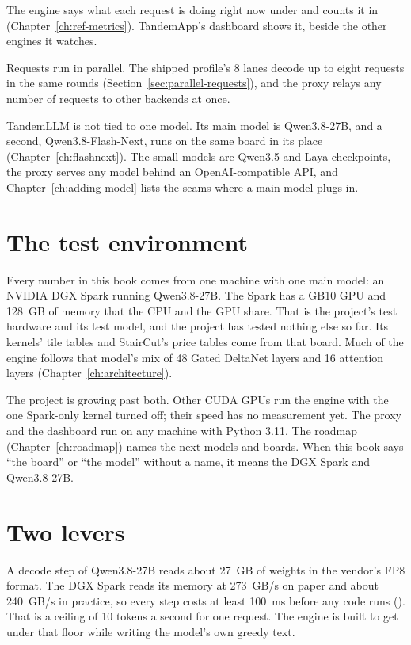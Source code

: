 The engine says what each request is doing right now under  and counts it in  (Chapter~\ref{ch:ref-metrics}). TandemApp's dashboard shows it, beside the other engines it watches.

Requests run in parallel. The shipped profile's 8 lanes decode up to eight requests in the same rounds (Section~\ref{sec:parallel-requests}), and the proxy relays any number of requests to other backends at once.

TandemLLM is not tied to one model. Its main model is Qwen3.8-27B, and a second, Qwen3.8-Flash-Next, runs on the same board in its place (Chapter~\ref{ch:flashnext}). The small models are Qwen3.5 and Laya checkpoints, the proxy serves any model behind an OpenAI-compatible API, and Chapter~\ref{ch:adding-model} lists the seams where a main model plugs in.

\section{The test environment}\label{sec:test-env}

Every number in this book comes from one machine with one main model: an NVIDIA DGX Spark running Qwen3.8-27B. The Spark has a GB10 GPU and 128~GB of memory that the CPU and the GPU share. That is the project's test hardware and its test model, and the project has tested nothing else so far. Its kernels' tile tables and StairCut's price tables come from that board. Much of the engine follows that model's mix of 48 Gated DeltaNet layers and 16 attention layers (Chapter~\ref{ch:architecture}).

The project is growing past both. Other CUDA GPUs run the engine with the one Spark-only kernel turned off; their speed has no measurement yet. The proxy and the dashboard run on any machine with Python 3.11. The roadmap (Chapter~\ref{ch:roadmap}) names the next models and boards. When this book says \enquote{the board} or \enquote{the model} without a name, it means the DGX Spark and Qwen3.8-27B.

\section{Two levers}

A decode step of Qwen3.8-27B reads about 27~GB of weights in the vendor's FP8 format. The DGX Spark reads its memory at 273~GB/s on paper and about 240~GB/s in practice, so every step costs at least 100~ms before any code runs (\arith). That is a ceiling of 10 tokens a second for one request. The engine is built to get under that floor while writing the model's own greedy text.

